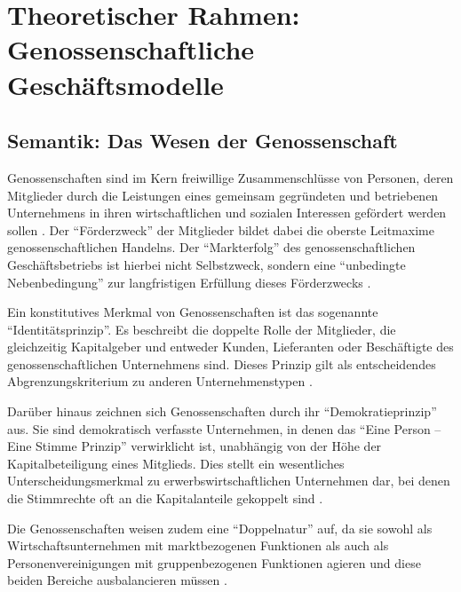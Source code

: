 \section{Theoretischer Rahmen: Genossenschaftliche Geschäftsmodelle}

\subsection{Semantik: Das Wesen der Genossenschaft}

Genossenschaften sind im Kern freiwillige Zusammenschlüsse von Personen, deren Mitglieder durch die Leistungen eines gemeinsam gegründeten und betriebenen Unternehmens in ihren wirtschaftlichen und sozialen Interessen gefördert werden sollen \autocite{blome-dreesGenossenschaftlicheGeschaeftsmodelleSemantik2023}. Der \enquote{Förderzweck} der Mitglieder bildet dabei die oberste Leitmaxime genossenschaftlichen Handelns. Der \enquote{Markterfolg} des genossenschaftlichen Geschäftsbetriebs ist hierbei nicht Selbstzweck, sondern eine \enquote{unbedingte Nebenbedingung} zur langfristigen Erfüllung dieses Förderzwecks \autocite{blome-dreesGenossenschaftlicheGeschaeftsmodelleSemantik2023}.

Ein konstitutives Merkmal von Genossenschaften ist das sogenannte \enquote{Identitätsprinzip}. Es beschreibt die doppelte Rolle der Mitglieder, die gleichzeitig Kapitalgeber und entweder Kunden, Lieferanten oder Beschäftigte des genossenschaftlichen Unternehmens sind. Dieses Prinzip gilt als entscheidendes Abgrenzungskriterium zu anderen Unternehmenstypen \autocite{blome-dreesGenossenschaftlicheGeschaeftsmodelleSemantik2023}. 

Darüber hinaus zeichnen sich Genossenschaften durch ihr \enquote{Demokratieprinzip} aus. Sie sind demokratisch verfasste Unternehmen, in denen das \enquote{Eine Person – Eine Stimme Prinzip} verwirklicht ist, unabhängig von der Höhe der Kapitalbeteiligung eines Mitglieds. Dies stellt ein wesentliches Unterscheidungsmerkmal zu erwerbswirtschaftlichen Unternehmen dar, bei denen die Stimmrechte oft an die Kapitalanteile gekoppelt sind \autocite{blome-dreesGenossenschaftlicheGeschaeftsmodelleSemantik2023}. 

Die Genossenschaften weisen zudem eine \enquote{Doppelnatur} auf, da sie sowohl als Wirtschaftsunternehmen mit marktbezogenen Funktionen als auch als Personenvereinigungen mit gruppenbezogenen Funktionen agieren und diese beiden Bereiche ausbalancieren müssen \autocite{blome-dreesGenossenschaftlicheGeschaeftsmodelleSemantik2023}.

